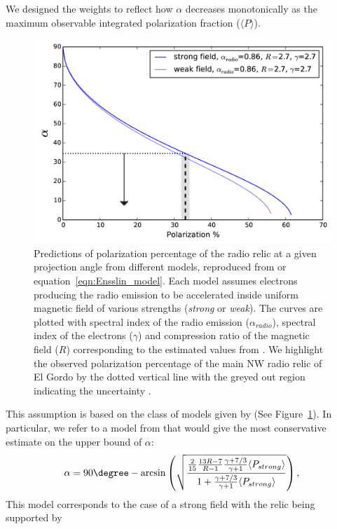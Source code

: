 \documentclass[letterpaper,useAMS,usenatbib]{mn2e}
\begin{document}
We designed the weights to reflect how $\alpha$ decreases monotonically as the
maximum observable integrated polarization fraction ($\langle P \rangle$). 
\begin{figure}
	\includegraphics[width=\linewidth]{Ensslin_polar_fig.png}
	\caption{Predictions of polarization percentage of the radio relic at a
		given projection angle from different models, reproduced from
		\citep{E98} or equation~\ref{eqn:Ensslin_model}. Each model assumes electrons producing the radio emission
		to be accelerated inside uniform magnetic field of various strengths ({\it strong} or 
		{\it weak}). The curves are plotted with spectral index of the radio emission
		($\alpha_{radio}$), spectral index of the electrons ($\gamma$) and
		compression ratio of the magnetic field ($R$) corresponding to the
		estimated values from \citet{L13}.
		We highlight the observed polarization percentage of the main NW radio relic
		of El Gordo by the dotted vertical line with the greyed out region
		indicating the uncertainty \citep{L13}.\label{fig:Ensslin_fig}}
\end{figure}
This assumption is based on the class of models given by \cite{E98}(See
Figure~\ref{fig:Ensslin_fig}). In particular, we refer to a model from \cite{E98} 
that would give the most
conservative estimate on the upper bound of $\alpha$:
\begin{equation}
	\alpha = 90 \degree - \arcsin \left( \sqrt{\frac{\frac{2}{15} \frac{13R -
	7}{R - 1} \frac{\gamma + 7/3}{\gamma + 1} \langle P_{strong} \rangle}{1 +
		\frac{\gamma + 7/3}{\gamma +1} \langle P_{strong} \rangle
	}}\right),\label{eqn:Ensslin_model}
\end{equation}
This model corresponds to the case of a strong field with the relic being supported by
\end{document}
